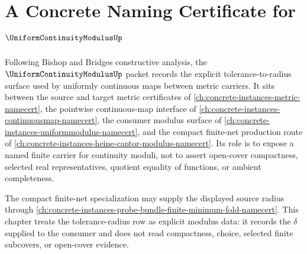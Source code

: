 \chapter{A Concrete Naming Certificate for $\UniformContinuityModulusUp$}
\label{ch:concrete-instances-uniform-continuity-modulus-namecert}

Following Bishop and Bridges constructive analysis, the $\UniformContinuityModulusUp$ packet records the explicit tolerance-to-radius surface used by uniformly continuous maps between metric carriers. It sits between the source and target metric certificates of \autoref{ch:concrete-instances-metric-namecert}, the pointwise continuous-map interface of \autoref{ch:concrete-instances-continuousmap-namecert}, the consumer modulus surface of \autoref{ch:concrete-instances-uniformmodulus-namecert}, and the compact finite-net production route of \autoref{ch:concrete-instances-heine-cantor-modulus-namecert}. Its role is to expose a named finite carrier for continuity moduli, not to assert open-cover compactness, selected real representatives, quotient equality of functions, or ambient completeness.

The compact finite-net specialization may supply the displayed source radius through \autoref{ch:concrete-instances-probe-bundle-finite-minimum-fold-namecert}. This chapter treats the tolerance-radius row as explicit modulus data: it records the $\delta$ supplied to the consumer and does not read compactness, choice, selected finite subcovers, or open-cover evidence.

